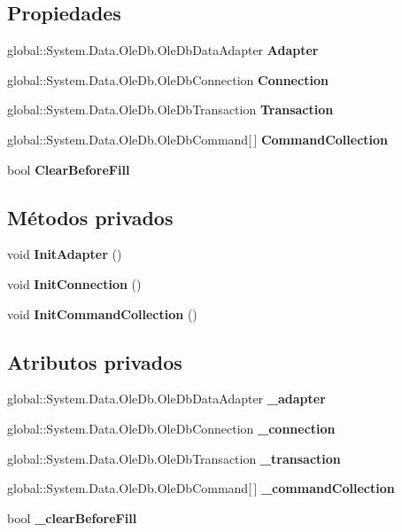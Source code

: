 \subsection*{Propiedades}
\begin{DoxyCompactItemize}
\item 
global\-::\-System.\-Data.\-Ole\-Db.\-Ole\-Db\-Data\-Adapter {\bf Adapter}\hspace{0.3cm}{\ttfamily  [get]}
\item 
global\-::\-System.\-Data.\-Ole\-Db.\-Ole\-Db\-Connection {\bf Connection}\hspace{0.3cm}{\ttfamily  [get, set]}
\item 
global\-::\-System.\-Data.\-Ole\-Db.\-Ole\-Db\-Transaction {\bf Transaction}\hspace{0.3cm}{\ttfamily  [get, set]}
\item 
global\-::\-System.\-Data.\-Ole\-Db.\-Ole\-Db\-Command[$\,$] {\bf Command\-Collection}\hspace{0.3cm}{\ttfamily  [get]}
\item 
bool {\bf Clear\-Before\-Fill}\hspace{0.3cm}{\ttfamily  [get, set]}
\end{DoxyCompactItemize}
\subsection*{Métodos privados}
\begin{DoxyCompactItemize}
\item 
void {\bf Init\-Adapter} ()
\item 
void {\bf Init\-Connection} ()
\item 
void {\bf Init\-Command\-Collection} ()
\end{DoxyCompactItemize}
\subsection*{Atributos privados}
\begin{DoxyCompactItemize}
\item 
global\-::\-System.\-Data.\-Ole\-Db.\-Ole\-Db\-Data\-Adapter {\bf \-\_\-adapter}
\item 
global\-::\-System.\-Data.\-Ole\-Db.\-Ole\-Db\-Connection {\bf \-\_\-connection}
\item 
global\-::\-System.\-Data.\-Ole\-Db.\-Ole\-Db\-Transaction {\bf \-\_\-transaction}
\item 
global\-::\-System.\-Data.\-Ole\-Db.\-Ole\-Db\-Command[$\,$] {\bf \-\_\-command\-Collection}
\item 
bool {\bf \-\_\-clear\-Before\-Fill}
\end{DoxyCompactItemize}


